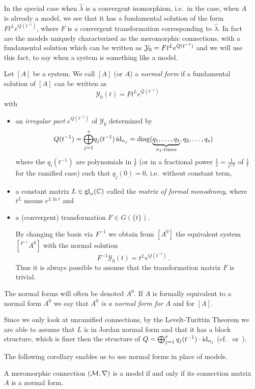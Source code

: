In the special case when $\hat\lambda$ is a convergent isomorphism, i.e.\ in
the case, when $A$ is already a model, we see that it has a fundamental
solution of the form $Ft^L e^{Q(t^{-1})}$, where $F$ is a convergent
transformation corresponding to $\hat\lambda$.
In fact are the models uniquely characterized as the meromorphic connections,
with a fundamental solution which can be written as $\mathcal{Y}_0=Ft^Le^{Q(t^{-1})}$
and we will use this fact, to say when a system is something like a model.
\begin{defn}\label{defn:normSol}
  Let $[A]$ be a system.
  We call $[A]$ (or $A$) a \emph{normal form} if a fundamental solution of
  $[A]$ can be written as
  \[
    \mathcal{Y}_0(t)=F t^L e^{Q(t^{-1})}
  \]
  with
  \begin{itemize}
    \item an \emph{irregular part} $e^{Q(t^{-1})}$ of $\mathcal{Y}_0$
      determined by
      \[
        Q(t^{-1})=\underset{j=1}{\overset{s}{\bigoplus}}q_j(t^{-1})\id_{n_j}
          =\diag(\underset{n_1\text{-times}}{\underbrace{%
          q_1,\dots,q_1}},q_2,\dots,q_s)
      \]
      where the $q_i(t^{-1})$ are polynomials in $\frac{1}{t}$ (or in a
      fractional power $\frac{1}{s}=\frac{1}{t^{1/p}}$ of $\frac{1}{t}$ for the
      ramified case) such that $q_j(0)=0$, i.e.\ without constant term,
    \item a constant matrix $L\in\operatorname{gl}_n(\mathbb{C})$ called the \emph{matrix of formal
      monodromy}, where $t^L$ means $e^{L\ln t}$ and
    \item a (convergent) transformation $F\in G(\!\{t\}\!)$.
      \begin{s-rem}
        By changing the basis via $F^{-1}$ we obtain from $[A^0]$ the
        equivalent system $[{}^{F^{-1}}\!A^0]$ with the normal solution
        \[
          F^{-1}\mathcal{Y}_0(t)=t^L e^{Q(t^{-1})} \,.
        \]
        Thus it is always possible to assume that the transformation matrix $F$
        is trivial.
      \end{s-rem}
  \end{itemize}
  The normal forms will often be denoted $A^0$.
  If $A$ is formally equivalent to a normal form $A^0$ we say that $A^0$
  \emph{is a normal form for} $A$ and for $[A]$.
\end{defn}
\begin{cor}\label{cor:structuralAssumptions}
  Since we only look at unramified connections, by the Levelt-Turittin Theorem
  we are able to assume that $L$ is in Jordan normal form and that it has a
  block structure, which is finer then the structure of
  $Q=\bigoplus_{j=1}^sq_j(t^{-1})\cdot\operatorname{id}_{n_j}$
  (cf.~\cite[Sec.1]{Remy2014} or~\cite[Sec.4]{Martinet1991}).
\end{cor}
The following corollary enables us to use normal forms in place of models.
\begin{cor}
  A meromorphic connection $(\mathcal{M},\nabla)$ is a model if and only if its
  connection matrix $A$ is a normal form.
\end{cor}

